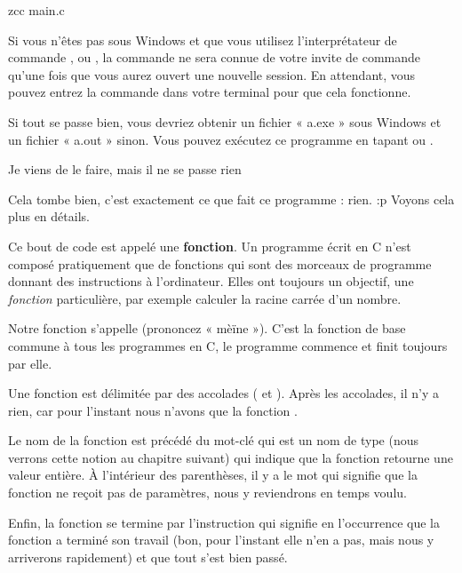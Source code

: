 \begin{C}
zcc main.c
\end{C}

\clearpage

\begin{attentionbox}
  Si vous n'êtes pas sous Windows et que vous utilisez
  l'interprétateur de commande ,  ou ,
  la commande  ne sera connue de votre invite de commande
  qu'une fois que vous aurez ouvert une nouvelle session. En
  attendant, vous pouvez entrez la commande  dans
  votre terminal pour que cela fonctionne.
\end{attentionbox}

Si tout se passe bien, vous devriez obtenir un fichier « a.exe » sous
Windows et un fichier « a.out » sinon. Vous pouvez exécutez ce programme
en tapant  ou .

\begin{questionbox}
  Je viens de le faire, mais il ne se passe rien
\end{questionbox}


Cela tombe bien, c'est exactement ce que fait ce programme : rien. :p
Voyons cela plus en détails.

Ce bout de code est appelé une \textbf{fonction}. Un programme écrit en
C n'est composé pratiquement que de fonctions qui sont des morceaux de
programme donnant des instructions à l'ordinateur. Elles ont toujours un
objectif, une \emph{fonction} particulière, par exemple calculer la
racine carrée d'un nombre.

Notre fonction s'appelle  (prononcez « mèïne »). C'est la
fonction de base commune à tous les programmes en C, le programme
commence et finit toujours par elle.

Une fonction est délimitée par des accolades (\mybox{\{} et
\mybox{\}}). Après les accolades, il n'y a rien, car pour l'instant
nous n'avons que la fonction .

Le nom de la fonction est précédé du mot-clé  qui est un nom
de type (nous verrons cette notion au chapitre suivant) qui indique que
la fonction retourne une valeur entière. À l'intérieur des parenthèses,
il y a le mot  qui signifie que la fonction ne reçoit pas
de paramètres, nous y reviendrons en temps voulu.

Enfin, la fonction se termine par l'instruction  qui
signifie en l'occurrence que la fonction a terminé son travail (bon,
pour l'instant elle n'en a pas, mais nous y arriverons rapidement) et
que tout s'est bien passé.

